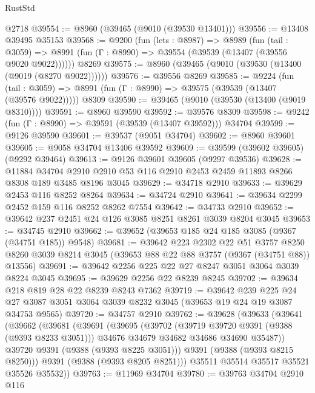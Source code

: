 \begin{lexlean}{RustStd}
\begin{coremodule}
    @2718
@39554 := @8960 (@39465 (@9010 (@39530 @13401)))
@39556 := @13408 @39495 @35153
@39568 := @9200
    (fun (lets : @8987) =>
    @8989
      (fun (tail : @3059) =>
      @8991 (fun (Γ : @8990) => @39554 (@39539 (@13407 (@39556 @9020 @9022))))))
    @8269
@39575 := @8960 (@39465 (@9010 (@39530 (@13400 (@9019 (@8270 @9022))))))
@39576 := @39556 @8269
@39585 := @9224
    (fun (tail : @3059) => @8991 (fun (Γ : @8990) => @39575 (@39539 (@13407 (@39576 @9022)))))
    @8309
@39590 := @39465 (@9010 (@39530 (@13400 (@9019 @8310))))
@39591 := @8960 @39590
@39592 := @39576 @8309
@39598 := @9242 (fun (Γ : @8990) => @39591 (@39539 (@13407 @39592))) @34704
@39599 := @9126 @39590
@39601 := @39537 (@9051 @34704)
@39602 := @8960 @39601
@39605 := @9058 @34704 @13406 @39592
@39609 := @39599 (@39602 @39605) (@9292 @39464)
@39613 := @9126 @39601 @39605 (@9297 @39536)
@39628 := @11884
    @34704
    @2910
    @2910
    @53
    @116
    @2910
    @2453
    @2459
    @11893
    @8266
    @8308
    @189
    @3485
    @8196
    @3045
@39629 := @34718 @2910
@39633 := @39629 @2453 @116 @8252 @8264
@39634 := @34724 @2910
@39641 := @39634 @2299 @2452 @159 @116 @8252 @8262 @7554
@39642 := @34733 @2910
@39652 := @39642 @237 @2451 @24 @126 @3085 @8251 @8261 @3039 @8204 @3045
@39653 := @34745 @2910
@39662 := @39652 (@39653 @185 @24 @185 @3085 (@9367 (@34751 @185)) @9548)
@39681 := @39642
    @223
    @2302
    @22
    @51
    @3757
    @8250
    @8260
    @3039
    @8214
    @3045
    (@39653 @88 @22 @88 @3757 (@9367 (@34751 @88)) @13556)
@39691 := @39642 @2256 @225 @22 @27 @8247 @3051 @3064 @3039 @8224 @3045
@39695 := @39629 @2256 @22 @8239 @8245
@39702 := @39634 @218 @819 @28 @22 @8239 @8243 @7362
@39719 := @39642
    @239
    @225
    @24
    @27
    @3087
    @3051
    @3064
    @3039
    @8232
    @3045
    (@39653 @19 @24 @19 @3087 @34753 @9565)
@39720 := @34757 @2910
@39762 := @39628
    (@39633
      (@39641
        (@39662
          (@39681
            (@39691
              (@39695
                (@39702
                  (@39719 @39720 @9391 (@9388 (@9393 @8233 @3051)))
                  @34676
                  @34679
                  @34682
                  @34686
                  @34690
                  @35487))
              @39720
              @9391
              (@9388 (@9393 @8225 @3051)))
            @9391
            (@9388 (@9393 @8215 @8250)))
          @9391
          (@9388 (@9393 @8205 @8251)))
        @35511
        @35514
        @35517
        @35521
        @35526
        @35532))
@39763 := @11969 @34704
@39780 := @39763
    @34704
    @2910
    @116

\end{coremodule}
\end{lexlean}
